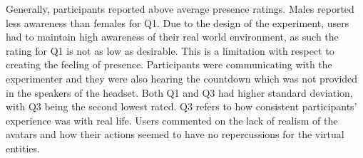 Generally, participants reported above average presence ratings. Males reported less awareness than females for Q1. Due to the design of the experiment, users had to maintain high awareness of their real world environment, as such the rating for Q1 is not as low as desirable. This is a limitation with respect to creating the feeling of presence. Participants were communicating with the experimenter and they were also hearing the countdown which was not provided in the speakers of the headset. Both Q1 and Q3 had higher standard deviation, with Q3 being the second lowest rated. Q3 refers to how consistent participants' experience was with real life. Users commented on the lack of realism of the avatars and how their actions seemed to have no repercussions for the virtual entities. \\

\clearpage

